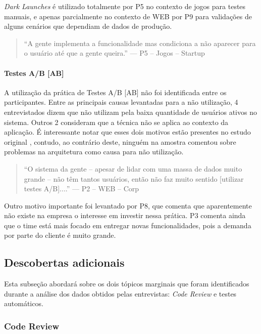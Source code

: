 \emph{Dark Launches} é utilizado totalmente por P5 no contexto de jogos para testes manuais, e apenas parcialmente no contexto de WEB por P9 para validações de alguns cenários que dependiam de dados de produção.


\begin{quote}
    ``A gente implementa a funcionalidade mas condiciona a não aparecer para o usuário até que a gente queira.'' --- P5 -- Jogos -- Startup
\end{quote}

\paragraph*{Testes A/B [AB]}

A utilização da prática de Testes A/B [AB] \cite{testsAB} não foi identificada entre os participantes. Entre as principais causas levantadas para a não utilização, 4 entrevistados dizem que não utilizam pela baixa quantidade de usuários ativos no sistema. Outros 2 consideram que a técnica não se aplica ao contexto da aplicação. É interessante notar que esses dois motivos estão presentes no estudo original \cite{empiricalStudy2016}, contudo, ao contrário deste, ninguém na amostra comentou sobre problemas na arquitetura como causa para não utilização.


\begin{quote}
    ``O sistema da gente -- apesar de lidar com uma massa de dados muito grande -- não têm tantos usuários, então não faz muito sentido [utilizar testes A/B]....'' --- P2 -- WEB -- Corp
\end{quote}

Outro motivo importante foi levantado por P8, que comenta que aparentemente não existe na empresa o interesse em investir nessa prática. P3 comenta ainda que o time está mais focado em entregar novas funcionalidades, pois a demanda por parte do cliente é muito grande.

\subsection{Descobertas adicionais}

Esta subseção abordará sobre os dois tópicos marginais que foram identificados durante a análise dos dados obtidos pelas entrevistas: \emph{Code Review} e testes automáticos.

\subsubsection*{Code Review}

